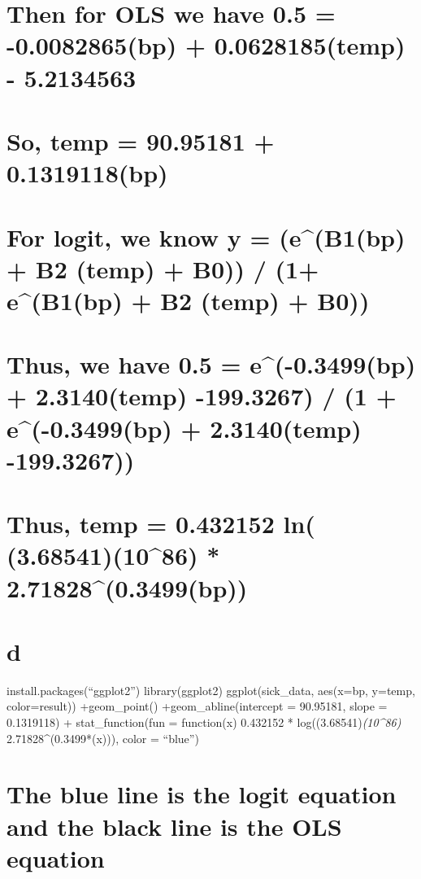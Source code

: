 \documentclass[]{article}
\begin{document}
\section{Then for OLS we have 0.5 = -0.0082865(bp) + 0.0628185(temp) -
5.2134563}\label{then-for-ols-we-have-0.5--0.0082865bp-0.0628185temp---5.2134563}

\section{So, temp = 90.95181 +
0.1319118(bp)}\label{so-temp-90.95181-0.1319118bp}

\section{For logit, we know y = (e\^{}(B1(bp) + B2 (temp) + B0)) / (1+
e\^{}(B1(bp) + B2 (temp) +
B0))}\label{for-logit-we-know-y-eb1bp-b2-temp-b0-1-eb1bp-b2-temp-b0}

\section{Thus, we have 0.5 = e\^{}(-0.3499(bp) + 2.3140(temp) -199.3267)
/ (1 + e\^{}(-0.3499(bp) + 2.3140(temp)
-199.3267))}\label{thus-we-have-0.5-e-0.3499bp-2.3140temp--199.3267-1-e-0.3499bp-2.3140temp--199.3267}

\section{Thus, temp = 0.432152 ln( (3.68541)(10\^{}86) *
2.71828\^{}(0.3499(bp))}\label{thus-temp-0.432152-ln-3.685411086-2.718280.3499bp}

\section{d}\label{d}

install.packages(``ggplot2'') library(ggplot2) ggplot(sick\_data,
aes(x=bp, y=temp, color=result)) +geom\_point() +geom\_abline(intercept
= 90.95181, slope = 0.1319118) + stat\_function(fun = function(x)
0.432152 * log((3.68541)\emph{(10\^{}86) } 2.71828\^{}(0.3499*(x))),
color = ``blue'')

\section{The blue line is the logit equation and the black line is the
OLS
equation}\label{the-blue-line-is-the-logit-equation-and-the-black-line-is-the-ols-equation}
\end{document}
